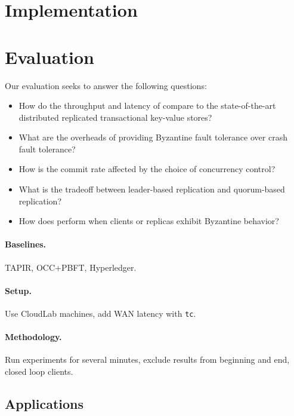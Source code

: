 \section{Implementation}

\section{Evaluation}

Our evaluation seeks to answer the following questions:
\begin{itemize}
  \item How do the throughput and latency of \sys{} compare to the
    state-of-the-art distributed replicated transactional key-value
    stores?
  \item What are the overheads of providing Byzantine fault tolerance over
    crash fault tolerance?
  \item How is the commit rate affected by the choice of concurrency control?
  \item What is the tradeoff between leader-based replication and quorum-based
    replication?
  \item How does \sys{} perform when clients or replicas exhibit Byzantine
    behavior?
\end{itemize}

\paragraph{Baselines.} TAPIR, OCC+PBFT, Hyperledger.
\paragraph{Setup.} Use CloudLab machines, add WAN latency with \texttt{tc}.
\paragraph{Methodology.} Run experiments for several minutes, exclude results
from beginning and end, closed loop clients.

\subsection{Applications}

